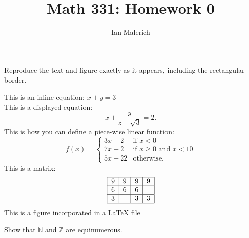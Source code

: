 \documentclass[12pt]{jhwhw}
\author{Ian Malerich}
\title{Math 331: Homework 0}
\begin{document}
\raggedright{}

\problem{}

	Reproduce the text and figure exactly as it appears, including the rectangular border.

\solution
\begin{spacing}{1.0}
\begin{framed}

	This is an inline equation: $x+y=3$ \\
	This is a displayed equation:
	$$
		x + \frac{y}{z - \sqrt{3}} = 2.
	$$
	This is how you can define a piece-wise linear function: \\
	$$ 
		f(x) = 
		\begin{cases}
			3x + 2 & \text{if } x<0 \\
			7x + 2 & \text{if } x\ge 0 \text{ and }x<10 \\
			5x + 22 & \text{otherwise.}
		\end{cases} 
	$$
	This is a matrix: \\
	\renewcommand{\arraystretch}{1.4}
	$$
		\begin{tabular}{|c|c|c|c|}
			\hline
			9 & 9 & 9 & 9 \\
			\hline
			6 & 6 & 6 & \\
			\hline
			3 &   & 3 & 3 \\
			\hline
		\end{tabular}
	$$
	This is a figure incorporated in a LaTeX file \\

\end{framed}
\end{spacing}

\problem{}

	Show that $\mathbb{N}$ and $\mathbb{Z}$ are equinumerous.
\end{document}
